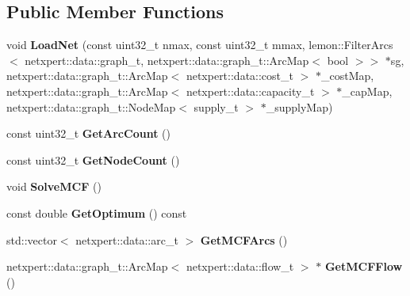 \subsection*{Public Member Functions}
\begin{DoxyCompactItemize}
\item 
void {\bfseries Load\+Net} (const uint32\+\_\+t nmax, const uint32\+\_\+t mmax, lemon\+::\+Filter\+Arcs$<$ netxpert\+::data\+::graph\+\_\+t, netxpert\+::data\+::graph\+\_\+t\+::\+Arc\+Map$<$ bool $>$$>$ $\ast$sg, netxpert\+::data\+::graph\+\_\+t\+::\+Arc\+Map$<$ netxpert\+::data\+::cost\+\_\+t $>$ $\ast$\+\_\+cost\+Map, netxpert\+::data\+::graph\+\_\+t\+::\+Arc\+Map$<$ netxpert\+::data\+::capacity\+\_\+t $>$ $\ast$\+\_\+cap\+Map, netxpert\+::data\+::graph\+\_\+t\+::\+Node\+Map$<$ supply\+\_\+t $>$ $\ast$\+\_\+supply\+Map)\hypertarget{classnetxpert_1_1core_1_1NS__LEM_a5cdf7a28a16732ce28eb95fe3255db2a}{}\label{classnetxpert_1_1core_1_1NS__LEM_a5cdf7a28a16732ce28eb95fe3255db2a}

\item 
const uint32\+\_\+t {\bfseries Get\+Arc\+Count} ()\hypertarget{classnetxpert_1_1core_1_1NS__LEM_a03a501e91d92869badc51835059a63d9}{}\label{classnetxpert_1_1core_1_1NS__LEM_a03a501e91d92869badc51835059a63d9}

\item 
const uint32\+\_\+t {\bfseries Get\+Node\+Count} ()\hypertarget{classnetxpert_1_1core_1_1NS__LEM_aec06454662c27708f592a7b4dc3f3c93}{}\label{classnetxpert_1_1core_1_1NS__LEM_aec06454662c27708f592a7b4dc3f3c93}

\item 
void {\bfseries Solve\+M\+CF} ()\hypertarget{classnetxpert_1_1core_1_1NS__LEM_ae34d52960b82c712554362e7730103c0}{}\label{classnetxpert_1_1core_1_1NS__LEM_ae34d52960b82c712554362e7730103c0}

\item 
const double {\bfseries Get\+Optimum} () const \hypertarget{classnetxpert_1_1core_1_1NS__LEM_a1458d55ff84f74ad2fbe040033bee38c}{}\label{classnetxpert_1_1core_1_1NS__LEM_a1458d55ff84f74ad2fbe040033bee38c}

\item 
std\+::vector$<$ netxpert\+::data\+::arc\+\_\+t $>$ {\bfseries Get\+M\+C\+F\+Arcs} ()\hypertarget{classnetxpert_1_1core_1_1NS__LEM_ad12184f360951418f2e00e3bfa0fe746}{}\label{classnetxpert_1_1core_1_1NS__LEM_ad12184f360951418f2e00e3bfa0fe746}

\item 
netxpert\+::data\+::graph\+\_\+t\+::\+Arc\+Map$<$ netxpert\+::data\+::flow\+\_\+t $>$ $\ast$ {\bfseries Get\+M\+C\+F\+Flow} ()\hypertarget{classnetxpert_1_1core_1_1NS__LEM_ae7cb3ce93684294d2f87c2504aa9757a}{}\label{classnetxpert_1_1core_1_1NS__LEM_ae7cb3ce93684294d2f87c2504aa9757a}


\end{DoxyCompactItemize}
